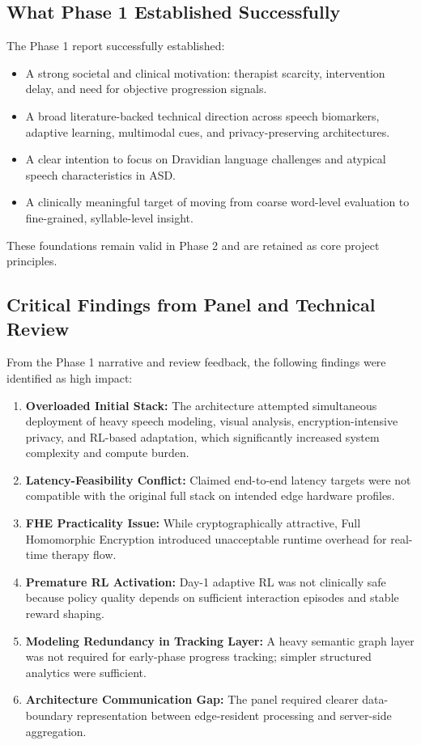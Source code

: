 \documentclass[12pt,a4paper]{article}
\begin{document}
\subsection{What Phase 1 Established Successfully}
The Phase 1 report successfully established:
\begin{itemize}[noitemsep,topsep=2pt]
\item A strong societal and clinical motivation: therapist scarcity, intervention delay, and need for objective progression signals.
\item A broad literature-backed technical direction across speech biomarkers, adaptive learning, multimodal cues, and privacy-preserving architectures.
\item A clear intention to focus on Dravidian language challenges and atypical speech characteristics in ASD.
\item A clinically meaningful target of moving from coarse word-level evaluation to fine-grained, syllable-level insight.
\end{itemize}

These foundations remain valid in Phase 2 and are retained as core project principles.

\subsection{Critical Findings from Panel and Technical Review}
From the Phase 1 narrative and review feedback, the following findings were identified as high impact:
\begin{enumerate}[noitemsep,topsep=2pt]
\item \textbf{Overloaded Initial Stack:} The architecture attempted simultaneous deployment of heavy speech modeling, visual analysis, encryption-intensive privacy, and RL-based adaptation, which significantly increased system complexity and compute burden.
\item \textbf{Latency-Feasibility Conflict:} Claimed end-to-end latency targets were not compatible with the original full stack on intended edge hardware profiles.
\item \textbf{FHE Practicality Issue:} While cryptographically attractive, Full Homomorphic Encryption introduced unacceptable runtime overhead for real-time therapy flow.
\item \textbf{Premature RL Activation:} Day-1 adaptive RL was not clinically safe because policy quality depends on sufficient interaction episodes and stable reward shaping.
\item \textbf{Modeling Redundancy in Tracking Layer:} A heavy semantic graph layer was not required for early-phase progress tracking; simpler structured analytics were sufficient.
\item \textbf{Architecture Communication Gap:} The panel required clearer data-boundary representation between edge-resident processing and server-side aggregation.
\end{enumerate}
\end{document}
